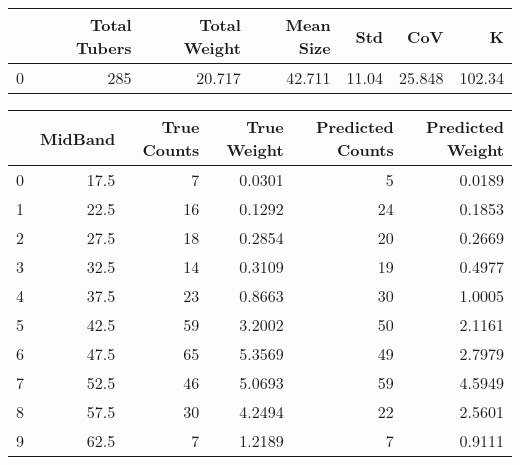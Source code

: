 \begin{tabular}{lrrrrrr}
\toprule
{} &  Total Tubers &  Total Weight &  Mean Size &    Std &     CoV &       K \\
\midrule
0 &           285 &        20.717 &     42.711 &  11.04 &  25.848 &  102.34 \\
\bottomrule
\end{tabular}

\begin{tabular}{lrrrrr}
\toprule
{} &  MidBand &  True Counts &  True Weight &  Predicted Counts &  Predicted Weight \\
\midrule
0 &     17.5 &            7 &       0.0301 &                 5 &            0.0189 \\
1 &     22.5 &           16 &       0.1292 &                24 &            0.1853 \\
2 &     27.5 &           18 &       0.2854 &                20 &            0.2669 \\
3 &     32.5 &           14 &       0.3109 &                19 &            0.4977 \\
4 &     37.5 &           23 &       0.8663 &                30 &            1.0005 \\
5 &     42.5 &           59 &       3.2002 &                50 &            2.1161 \\
6 &     47.5 &           65 &       5.3569 &                49 &            2.7979 \\
7 &     52.5 &           46 &       5.0693 &                59 &            4.5949 \\
8 &     57.5 &           30 &       4.2494 &                22 &            2.5601 \\
9 &     62.5 &            7 &       1.2189 &                 7 &            0.9111 \\
\bottomrule
\end{tabular}
